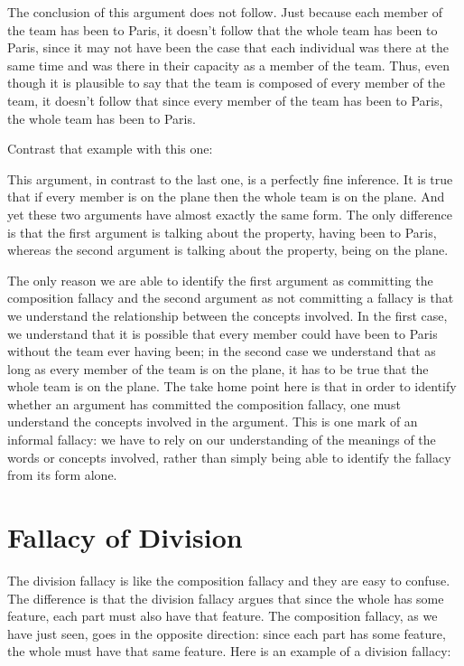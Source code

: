 The conclusion of this argument does not follow. Just because each member of the team has been to Paris, it doesn't follow that the whole team has been to Paris, since it may not have been the case that each individual was there at the same time and was there in their capacity as a member of the team. Thus, even though it is plausible to say that the team is composed of every member of the team, it doesn't follow that since every member of the team has been to Paris, the whole team has been to Paris.

Contrast that example with this one:

\begin{kormanize}
\end{kormanize}

This argument, in contrast to the last one, is a perfectly fine inference. It is true that if every member is on the plane then the whole team is on the plane. And yet these two arguments have almost exactly the same form. The only difference is that the first argument is talking about the property, having been to Paris, whereas the second argument is talking about the property, being on the plane.

The only reason we are able to identify the first argument as committing the composition fallacy and the second argument as not committing a fallacy is that we understand the relationship between the concepts involved. In the first case, we understand that it is possible that every member could have been to Paris without the team ever having been; in the second case we understand that as long as every member of the team is on the plane, it has to be true that the whole team is on the plane. The take home point here is that in order to identify whether an argument has committed the composition fallacy, one must understand the concepts involved in the argument. This is one mark of an informal fallacy: we have to rely on our understanding of the meanings of the words or concepts involved, rather than simply being able to identify the fallacy from its form alone.

\section{Fallacy of Division}\label{sec:division}
The division fallacy is like the composition fallacy and they are easy to confuse. The difference is that the division fallacy argues that since the whole has some feature, each part must also have that feature. The composition fallacy, as we have just seen, goes in the opposite direction: since each part has some feature, the whole must have that same feature. Here is an example of a division fallacy:

